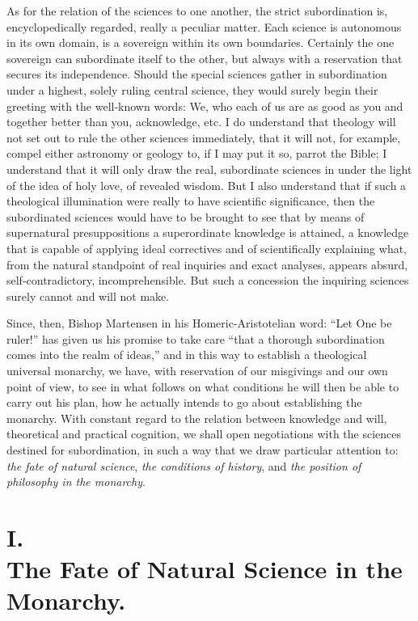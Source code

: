 \documentclass[12pt]{book}
\newcommand{\opage}[1]{\marginnote{\footnotesize\textit{[#1]}}}
\begin{document}
As for the relation of the sciences to one another, the strict subordination is, encyclopedically regarded, really a peculiar matter. Each science is autonomous in its own domain, is a sovereign within its own boundaries. Certainly the one sovereign can subordinate itself to the other, but always with a reservation that secures its independence. Should the special sciences gather in subordination under a highest, solely ruling central science, they would surely begin their greeting with the well-known words:
\opage{8}\setcounter{footnote}{0}%
We, who each of us are as good as you and together better than you, acknowledge, etc. I do understand that theology will not set out to rule the other sciences immediately, that it will not, for example, compel either astronomy or geology to, if I may put it so, parrot the Bible; I understand that it will only draw the real, subordinate sciences in under the light of the idea of holy love, of revealed wisdom. But I also understand that if such a theological illumination were really to have scientific significance, then the subordinated sciences would have to be brought to see that by means of supernatural presuppositions a superordinate knowledge is attained, a knowledge that is capable of applying ideal correctives and of scientifically explaining what, from the natural standpoint of real inquiries and exact analyses, appears absurd, self-contradictory, incomprehensible. But such a concession the inquiring sciences surely cannot and will not make.

Since, then, Bishop Martensen in his Homeric-Aristotelian word: ``Let One be ruler!'' has given us his promise to take care ``that a thorough subordination comes into the realm of ideas,'' and in this way to establish a theological universal monarchy, we have, with reservation of our misgivings and our own point of view, to see in what follows on what conditions he will then be able to carry out his plan, how he actually intends to go about establishing the monarchy. With constant regard to the relation between knowledge and will, theoretical and practical cognition, we shall open negotiations with the sciences destined for subordination, in such a way that we draw particular attention to: \emph{the fate of natural science}, \emph{the conditions of history}, and \emph{the position of philosophy in the monarchy}.

\opage{9}\setcounter{footnote}{0}%
\section*{I.\\ The Fate of Natural Science in the Monarchy.}
\end{document}
